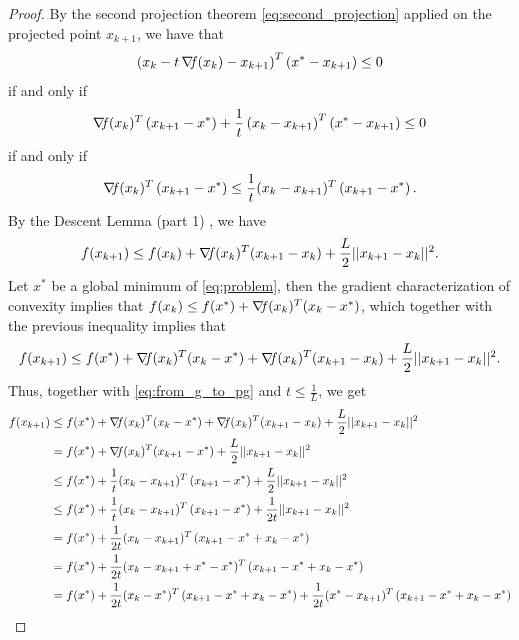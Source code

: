 \documentclass[10pt,a4paper]{article}
\begin{document}
\begin{proof}
	By the second projection theorem \eqref{eq:second_projection} applied on the projected point $x_{k+1}$, we have that 
	\begin{equation*}
		\left(x_k -t\operatorname*{\mathit{\nabla \!f}}(x_k) -x_{k+1}\right)^T\left(x^*-x_{k+1}\right)\leq 0
	\end{equation*}
	if and only if
	\begin{equation*}
		\operatorname*{\mathit{\nabla \!f}}(x_k)^T\left(x_{k+1}-x^*\right)+ \frac{1}{t}\left(x_k -x_{k+1}\right)^T\left(x^*-x_{k+1}\right)\leq0
	\end{equation*}
	if and only if
	\begin{equation}\label{eq:from_g_to_pg}
		\operatorname*{\mathit{\nabla \!f}}(x_k)^T\left(x_{k+1}-x^*\right) \leq \frac{1}{t}(x_k-x_{k+1})^T\left(x_{k+1}-x^*\right).
	\end{equation}
	By the Descent Lemma (part 1) , we have 
	\begin{equation*}
		f(x_{k+1}) \leq f(x_k)+\operatorname*{\mathit{\nabla \!f}}(x_k)^T(x_{k+1}-x_k) +\frac{L}{2}||x_{k+1}-x_k||^2.
	\end{equation*}
Let $x^*$ be a global minimum of \eqref{eq:problem}, then the gradient characterization of convexity implies that $f(x_k)\leq f(x^*)+\operatorname*{\mathit{\nabla \!f}}(x_k)^T(x_k-x^*)$, which together with the previous inequality implies that
\begin{equation*}
	f(x_{k+1}) \leq f(x^*)+\operatorname*{\mathit{\nabla \!f}}(x_k)^T(x_k-x^*)+\operatorname*{\mathit{\nabla \!f}}(x_k)^T(x_{k+1}-x_k) +\frac{L}{2}||x_{k+1}-x_k||^2.
\end{equation*}
Thus, together with \eqref{eq:from_g_to_pg} and $t\leq \frac{1}{L}$, we get
\begin{equation*}
	\begin{split}
		f(x_{k+1}) &\leq f(x^*)+\grad(x_k)^T(x_k-x^*)+\grad(x_k)^T(x_{k+1}-x_k) +\frac{L}{2}||x_{k+1}-x_k||^2\\
		& = f(x^*)+\grad(x_k)^T(x_{k+1}-x^*) +\frac{L}{2}||x_{k+1}-x_k||^2\\
		&\leq f(x^*)+\frac{1}{t}(x_k-x_{k+1})^T\left(x_{k+1}-x^*\right)+\frac{L}{2}||x_{k+1}-x_k||^2\\
		&\leq f(x^*)+\frac{1}{t}(x_k-x_{k+1})^T\left(x_{k+1}-x^*\right)+\frac{1}{2t}||x_{k+1}-x_k||^2\\
		&= f(x^*)+\frac{1}{2t}(x_k-x_{k+1})^T\left(x_{k+1}-x^*+x_k - x^*\right)\\
		&= f(x^*)+\frac{1}{2t}(x_k-x_{k+1}+x^*-x^*)^T\left(x_{k+1}-x^*+x_k - x^*\right)\\
		&= f(x^*)+\frac{1}{2t}(x_k-x^*)^T\left(x_{k+1}-x^*+x_k - x^*\right) + \frac{1}{2t}(x^*-x_{k+1})^T\left(x_{k+1}-x^*+x_k - x^*\right)\\

\end{split}
\end{equation*}
\end{proof}
\end{document}
